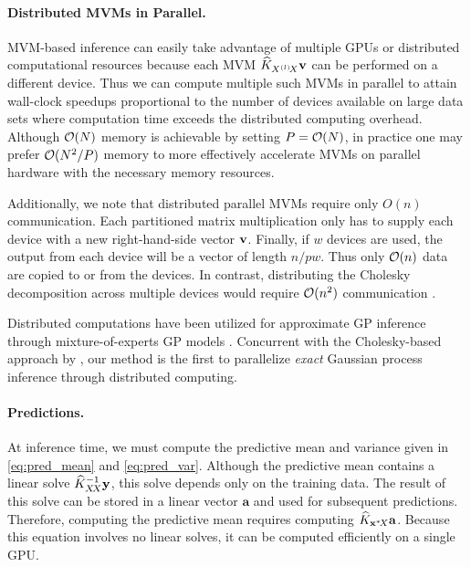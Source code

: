 \paragraph{Distributed MVMs in Parallel.}
MVM-based inference can easily take advantage of multiple GPUs or distributed
computational resources because each MVM $\widehat {K}_{X^{(l)}\!X}\mathbf{v}$ can be performed
on a different device. Thus we can compute multiple such MVMs in parallel to
attain wall-clock speedups proportional to the number of devices
available on large data sets where computation time exceeds the distributed
computing overhead. Although $\bigo{N}$ memory is achievable by setting $P = \bigo{N}$, in
practice one may prefer $\bigo{N^2/P}$ memory to more effectively accelerate
MVMs on parallel hardware with the necessary memory resources.

Additionally, we note that distributed parallel MVMs
require only $O(n)$ communication.
Each partitioned matrix multiplication only has
to supply each device with a new right-hand-side vector $\mathbf{v}$. Finally, if $w$ devices are used, the output from each
device will be a vector of length $n / pw$. Thus only $\bigo{n}$ data are copied to or from the devices.
In contrast, distributing the Cholesky decomposition across multiple devices
would require $\bigo{n^2}$ communication \citep{gustavson2006three} \citep{nguyen2019exact}.

Distributed computations have been utilized for approximate GP inference through
mixture-of-experts GP models \citep{deisenroth2015distributed}. Concurrent with the Cholesky-based approach by \citet{nguyen2019exact},
our method is the first to parallelize \emph{exact} Gaussian process inference through distributed computing.

\paragraph{Predictions.} At inference time, we must compute the predictive mean and variance
given in \eqref{eq:pred_mean} and \eqref{eq:pred_var}. Although the predictive mean contains a linear solve $\widehat {K}_{X \! X}^{-1}
\mathbf{y}$, this solve depends only on the training data. The result of this solve can
be stored in a linear vector $\mathbf{a}$ and used for subsequent
predictions. Therefore, computing the predictive mean requires computing
$\widehat {K}_{\mathbf{x}^{*} \! X} \mathbf{a}$. Because this equation involves no linear solves, it can be computed efficiently on a single GPU.

